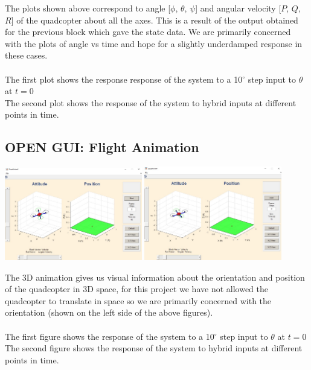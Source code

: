 \documentclass[9pt]{article}
\begin{document}
\noindent The plots shown above correspond to angle [$\phi$, $\theta$, $\psi$] and angular velocity [$P$, $Q$, $R$] of the quadcopter about all the axes. This is a result of the output obtained for the previous block which gave the state data. We are primarily concerned with the plots of angle vs time and hope for a slightly underdamped response in these cases.\\ \\
The first plot shows the response response of the system to a 10$^\circ$ step input to $\theta$ at $t=0$\\
The second plot shows the response of the system to hybrid inputs at different points in time.

\subsection{OPEN GUI: Flight Animation}

\begin{center}
\includegraphics[width=0.45\textwidth]{15.jpg}
\includegraphics[width=0.45\textwidth]{17.jpg}
\end{center}

\noindent The 3D animation gives us visual information about the orientation and position of the quadcopter in 3D space, for this project we have not allowed the quadcopter to translate in space so we are primarily concerned with the orientation (shown on the left side of the above figures). \\ \\
The first figure shows the response of the system to a 10$^\circ$ step input to $\theta$ at $t=0$\\
The second figure shows the response of the system to hybrid inputs at different points in time.
\end{document}

